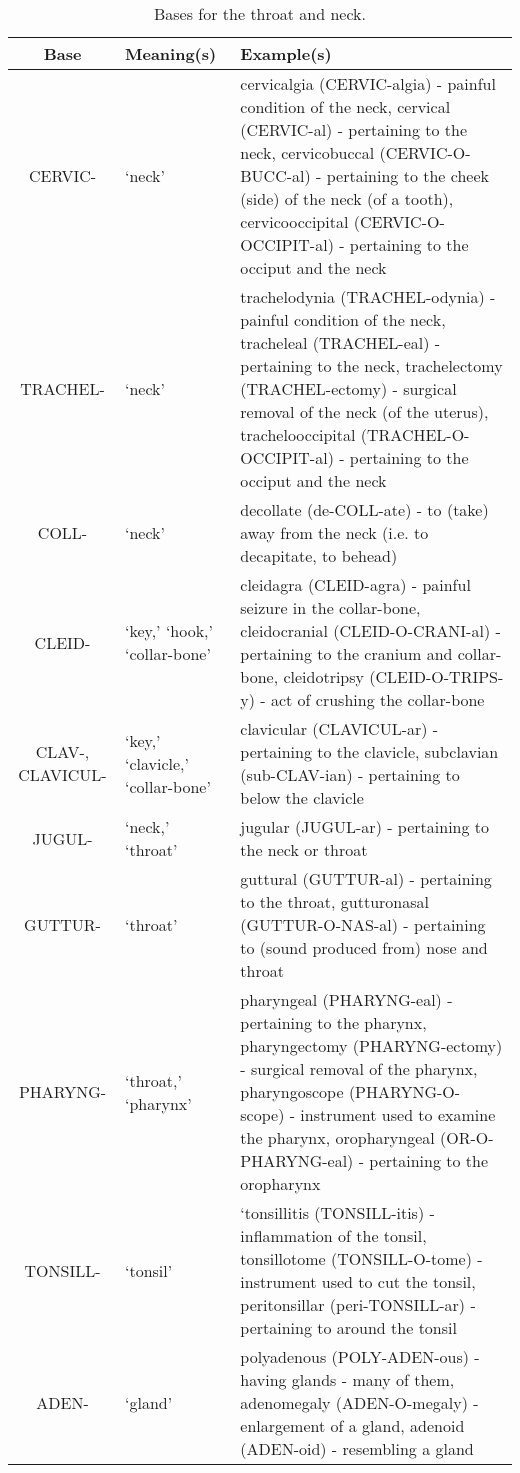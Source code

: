 \begin{longtable}{c | p{} | p{}}
    \caption{Bases for the throat and neck.}
    \hline
    Base & Meaning(s) & Example(s) \\ \hline
        CERVIC- & `neck' & cervicalgia (CERVIC-algia) - painful condition of the neck, cervical (CERVIC-al) - pertaining to the neck, cervicobuccal (CERVIC-O-BUCC-al) - pertaining to the cheek (side) of the neck (of a tooth), cervicooccipital (CERVIC-O-OCCIPIT-al) - pertaining to the occiput and the neck \\
        TRACHEL- & `neck' & trachelodynia (TRACHEL-odynia) - painful condition of the neck, tracheleal (TRACHEL-eal) - pertaining to the neck, trachelectomy (TRACHEL-ectomy) - surgical removal of the neck (of the uterus), trachelooccipital (TRACHEL-O-OCCIPIT-al) - pertaining to the occiput and the neck \\
        COLL- & `neck' & decollate (de-COLL-ate) - to (take) away from the neck (i.e. to decapitate, to behead) \\
        CLEID- & `key,' `hook,'  `collar-bone' & cleidagra (CLEID-agra) - painful seizure in the collar-bone, cleidocranial (CLEID-O-CRANI-al) - pertaining to the cranium and collar-bone, cleidotripsy (CLEID-O-TRIPS-y) - act of crushing the collar-bone \\
        CLAV-, CLAVICUL- & `key,' `clavicle,' `collar-bone' & clavicular (CLAVICUL-ar) - pertaining to the clavicle, subclavian (sub-CLAV-ian) - pertaining to below the clavicle \\
        JUGUL- & `neck,' `throat' & jugular (JUGUL-ar) - pertaining to the neck or throat \\
        GUTTUR- & `throat' & guttural (GUTTUR-al) - pertaining to the throat, gutturonasal (GUTTUR-O-NAS-al) - pertaining to (sound produced from) nose and throat \\
        PHARYNG- & `throat,' `pharynx' & pharyngeal (PHARYNG-eal) - pertaining to the pharynx, pharyngectomy (PHARYNG-ectomy) - surgical removal of the pharynx, pharyngoscope (PHARYNG-O-scope) - instrument used to examine the pharynx, oropharyngeal (OR-O-PHARYNG-eal) - pertaining to the oropharynx \\
        TONSILL- & `tonsil' & `tonsillitis (TONSILL-itis) - inflammation of the tonsil, tonsillotome (TONSILL-O-tome) - instrument used to cut the tonsil, peritonsillar (peri-TONSILL-ar) - pertaining to around the tonsil \\
        ADEN- & `gland' & polyadenous (POLY-ADEN-ous) - having glands - many of them, adenomegaly (ADEN-O-megaly) - enlargement of a gland, adenoid (ADEN-oid) - resembling a gland \\

\end{longtable}
